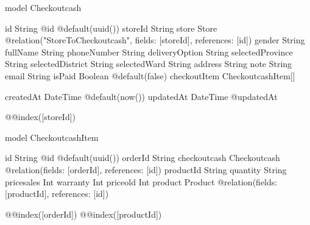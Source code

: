 model Checkoutcash {
  id               String             @id @default(uuid())
  storeId          String
  store            Store              @relation("StoreToCheckoutcash", fields: [storeId], references: [id])
  gender           String
  fullName         String
  phoneNumber      String
  deliveryOption   String
  selectedProvince String
  selectedDistrict String
  selectedWard     String
  address          String
  note             String
  email            String
  isPaid           Boolean            @default(false)
  checkoutItem     CheckoutcashItem[]

  createdAt DateTime @default(now())
  updatedAt DateTime @updatedAt

  @@index([storeId])
}

model CheckoutcashItem {
  id           String       @id @default(uuid())
  orderId      String
  checkoutcash Checkoutcash @relation(fields: [orderId], references: [id])
  productId    String
  quantity     String
  pricesales   Int
  warranty     Int
  priceold     Int
  product      Product      @relation(fields: [productId], references: [id])

  @@index([orderId])
  @@index([productId])
}
